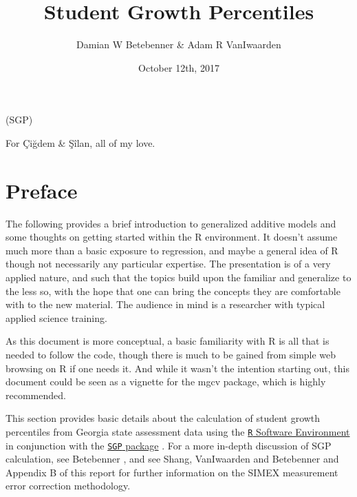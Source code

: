 \documentclass[]{tufte-book}
\title{Student Growth Percentiles}
\author{Damian W Betebenner \& Adam R VanIwaarden}
\date{October 12th, 2017}
\newenvironment{dedication}
  {%
   \thispagestyle{empty}%
   \vspace*{\stretch{1}}%
   \itshape             %
   \raggedleft          %
  }
  {\par %
   \vspace{\stretch{3}} %
   \clearpage           %
  }
\begin{document}
\maketitle


(SGP)

\begin{dedication}
For \c{C}i\u{g}dem \& \c{S}\^{i}lan, all of my love.
\end{dedication}

{
\setcounter{tocdepth}{1}
\tableofcontents
}

\chapter{Preface}\label{preface}

The following provides a brief introduction to generalized additive
models and some thoughts on getting started within the R environment. It
doesn't assume much more than a basic exposure to regression, and maybe
a general idea of R though not necessarily any particular expertise. The
presentation is of a very applied nature, and such that the topics build
upon the familiar and generalize to the less so, with the hope that one
can bring the concepts they are comfortable with to the new material.
The audience in mind is a researcher with typical applied science
training.

As this document is more conceptual, a basic familiarity with R is all
that is needed to follow the code, though there is much to be gained
from simple web browsing on R if one needs it. And while it wasn't the
intention starting out, this document could be seen as a vignette for
the {mgcv} package, which is highly recommended.

This section provides basic details about the calculation of student
growth percentiles from Georgia state assessment data using the
\href{http://www.r-project.org/}{\texttt{R} Software Environment}
\citep{Rsoftware} in conjunction with the
\href{https://github.com/CenterForAssessment/SGP}{\texttt{SGP} package}
\citep{sgp2017}. For a more in-depth discussion of SGP calculation, see
Betebenner \citeyearpar{Betebenner:2009}, and see Shang, VanIwaarden and
Betebenner \citeyearpar{ShangVanIBet:2015} and Appendix B of this report
for further information on the SIMEX measurement error correction
methodology.
\end{document}
